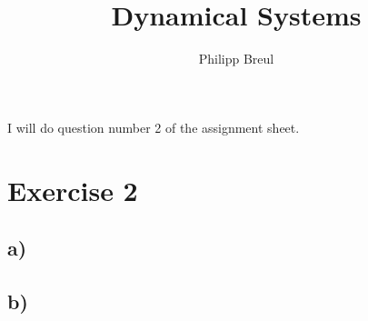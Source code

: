 \documentclass[11pt,a4paper,onecolumn]{article}
\author{Philipp Breul}
\title{Dynamical Systems}
\numberwithin{equation}{section} %
\begin{document}
\maketitle
\begin{center}
I will do question number 2 of the assignment sheet.
\end{center}
\setcounter{secnumdepth}{0}
\section{Exercise 2}
\subsection{a)}

\subsection{b)}

\end{document}

